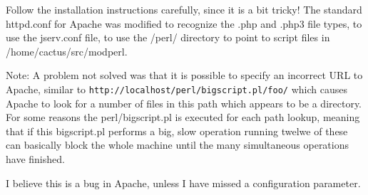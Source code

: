 Follow the installation instructions carefully, since it is a bit
tricky!  The standard httpd.conf for Apache was modified to recognize
the .php and .php3 file types, to use the jserv.conf file, to use the
/perl/ directory to point to script files in /home/cactus/src/modperl.



Note: A problem not solved was that it is possible to specify an
incorrect URL to Apache, similar to
\texttt{http://localhost/perl/bigscript.pl/foo/} which causes Apache
to look for a number of files in this path which appears to be a
directory.  For some reasons the perl/bigscript.pl is executed for
each path lookup, meaning that if this bigscript.pl performs a big,
slow operation running twelwe of these can basically block the whole
machine until the many simultaneous operations have finished.

I believe this is a bug in Apache, unless I have missed a
configuration parameter.













